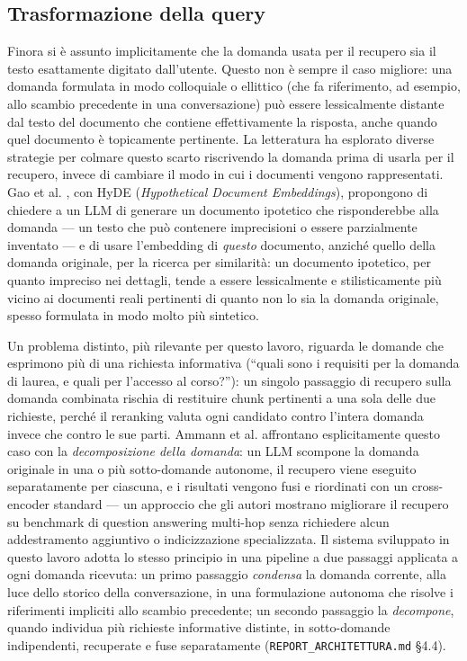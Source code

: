 \subsection{Trasformazione della query}

Finora si è assunto implicitamente che la domanda usata per il recupero sia il testo esattamente digitato
dall'utente. Questo non è sempre il caso migliore: una domanda formulata in modo colloquiale o ellittico (che fa
riferimento, ad esempio, allo scambio precedente in una conversazione) può essere lessicalmente distante dal testo
del documento che contiene effettivamente la risposta, anche quando quel documento è topicamente pertinente. La
letteratura ha esplorato diverse strategie per colmare questo scarto riscrivendo la domanda prima di usarla per il
recupero, invece di cambiare il modo in cui i documenti vengono rappresentati. Gao et al. \cite{gao2022hyde}, con
HyDE (\emph{Hypothetical Document Embeddings}), propongono di chiedere a un LLM di generare un documento ipotetico
che risponderebbe alla domanda --- un testo che può contenere imprecisioni o essere parzialmente inventato --- e di
usare l'embedding di \emph{questo} documento, anziché quello della domanda originale, per la ricerca per similarità:
un documento ipotetico, per quanto impreciso nei dettagli, tende a essere lessicalmente e stilisticamente più vicino
ai documenti reali pertinenti di quanto non lo sia la domanda originale, spesso formulata in modo molto più
sintetico.

Un problema distinto, più rilevante per questo lavoro, riguarda le domande che esprimono più di una richiesta
informativa (``quali sono i requisiti per la domanda di laurea, e quali per l'accesso al corso?''): un singolo
passaggio di recupero sulla domanda combinata rischia di restituire chunk pertinenti a una sola delle due richieste,
perché il reranking valuta ogni candidato contro l'intera domanda invece che contro le sue parti. Ammann et al.
\cite{ammann2025decomposition} affrontano esplicitamente questo caso con la \emph{decomposizione della domanda}: un
LLM scompone la domanda originale in una o più sotto-domande autonome, il recupero viene eseguito separatamente per
ciascuna, e i risultati vengono fusi e riordinati con un cross-encoder standard --- un approccio che gli autori
mostrano migliorare il recupero su benchmark di question answering multi-hop senza richiedere alcun addestramento
aggiuntivo o indicizzazione specializzata. Il sistema sviluppato in questo lavoro adotta lo stesso principio in una
pipeline a due passaggi applicata a ogni domanda ricevuta: un primo passaggio \emph{condensa} la domanda corrente,
alla luce dello storico della conversazione, in una formulazione autonoma che risolve i riferimenti impliciti allo
scambio precedente; un secondo passaggio la \emph{decompone}, quando individua più richieste informative distinte, in
sotto-domande indipendenti, recuperate e fuse separatamente (\texttt{REPORT\_ARCHITETTURA.md} \S4.4).

